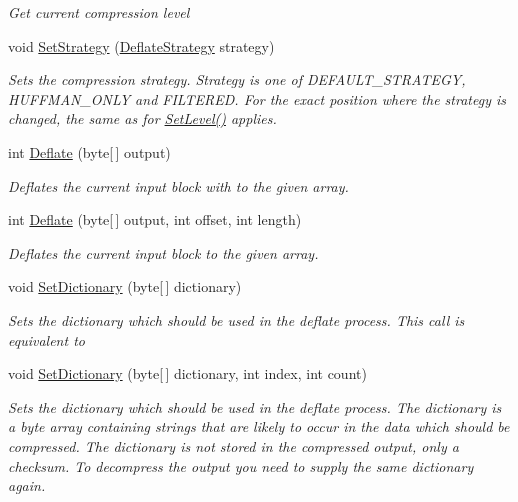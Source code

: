 \begin{DoxyCompactItemize}
\begin{DoxyCompactList}\small\item\em Get current compression level \end{DoxyCompactList}\item 
void \hyperlink{class_i_c_sharp_code_1_1_sharp_zip_lib_1_1_zip_1_1_compression_1_1_deflater_a1d3cf927ab2a1e6c6a477d9e2d2a1e93}{Set\+Strategy} (\hyperlink{namespace_i_c_sharp_code_1_1_sharp_zip_lib_1_1_zip_1_1_compression_a922c175879503e6b9e35641deccfbc40}{Deflate\+Strategy} strategy)
\begin{DoxyCompactList}\small\item\em Sets the compression strategy. Strategy is one of D\+E\+F\+A\+U\+L\+T\+\_\+\+S\+T\+R\+A\+T\+E\+GY, H\+U\+F\+F\+M\+A\+N\+\_\+\+O\+N\+LY and F\+I\+L\+T\+E\+R\+ED. For the exact position where the strategy is changed, the same as for \hyperlink{class_i_c_sharp_code_1_1_sharp_zip_lib_1_1_zip_1_1_compression_1_1_deflater_aeec1f91af74741790108b3af8f877b5e}{Set\+Level()} applies. \end{DoxyCompactList}\item 
int \hyperlink{class_i_c_sharp_code_1_1_sharp_zip_lib_1_1_zip_1_1_compression_1_1_deflater_a68958680d1f6cdaef83e705908e5c082}{Deflate} (byte\mbox{[}$\,$\mbox{]} output)
\begin{DoxyCompactList}\small\item\em Deflates the current input block with to the given array. \end{DoxyCompactList}\item 
int \hyperlink{class_i_c_sharp_code_1_1_sharp_zip_lib_1_1_zip_1_1_compression_1_1_deflater_a1611ccb20064abb42667e5cbf7b98c4a}{Deflate} (byte\mbox{[}$\,$\mbox{]} output, int offset, int length)
\begin{DoxyCompactList}\small\item\em Deflates the current input block to the given array. \end{DoxyCompactList}\item 
void \hyperlink{class_i_c_sharp_code_1_1_sharp_zip_lib_1_1_zip_1_1_compression_1_1_deflater_a37d15527b9581210462405f0d6fc05f9}{Set\+Dictionary} (byte\mbox{[}$\,$\mbox{]} dictionary)
\begin{DoxyCompactList}\small\item\em Sets the dictionary which should be used in the deflate process. This call is equivalent to \end{DoxyCompactList}\item 
void \hyperlink{class_i_c_sharp_code_1_1_sharp_zip_lib_1_1_zip_1_1_compression_1_1_deflater_a32ef3ee267c15d7a292d6e992c435160}{Set\+Dictionary} (byte\mbox{[}$\,$\mbox{]} dictionary, int index, int count)
\begin{DoxyCompactList}\small\item\em Sets the dictionary which should be used in the deflate process. The dictionary is a byte array containing strings that are likely to occur in the data which should be compressed. The dictionary is not stored in the compressed output, only a checksum. To decompress the output you need to supply the same dictionary again. \end{DoxyCompactList}\end{DoxyCompactItemize}
